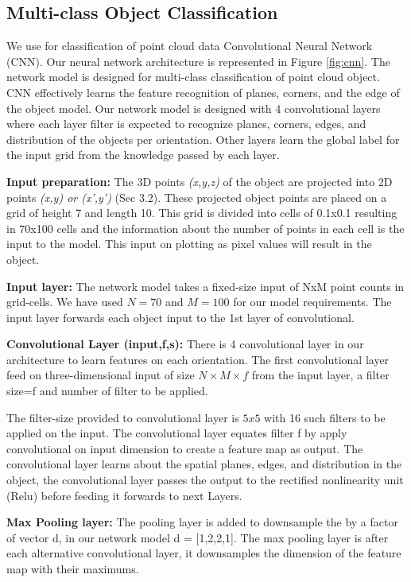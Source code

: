 \subsection{Multi-class Object Classification}
We use for classification of point cloud data Convolutional Neural Network (CNN).
Our neural network architecture is represented in Figure \ref{fig:cnn}.
The network model is designed for multi-class classification of point cloud object.
CNN effectively learns the feature recognition of planes, corners, and the edge of the object model.
Our network model is designed with 4 convolutional layers where each layer filter is expected to
recognize planes, corners, edges, and distribution of the objects per orientation.
Other layers learn the global label for the input grid from the knowledge passed by each layer.

\textbf{Input preparation:}
The 3D points \textit{(x,y,z)} of the object are projected into 2D points \textit{(x,y) or (x',y')} (Sec 3.2).
These projected object points are placed on a grid of height 7 and length 10.
This grid is divided into cells of 0.1x0.1 resulting in 70x100 cells and the information about the number of points in each cell is the input to the model.
This input on plotting as pixel values will result in the object.

\textbf{Input layer:}
The network model takes a fixed-size input of NxM point counts in grid-cells. We have
used $N=70$ and $M=100$ for our model requirements. The input layer forwards each object input to the 1st layer
of convolutional.


\textbf{Convolutional Layer (input,f,s):}
There is 4 convolutional layer in our architecture to learn features on each orientation.
The first convolutional layer feed on three-dimensional input of size $N \times  M \times f$ from
the input layer, a filter size=f and number of filter to be applied.

The filter-size provided to convolutional layer is $5x5$ with 16 such filters to be applied on the input.
The convolutional layer equates filter f by apply convolutional on input dimension to create a feature map as output.
The convolutional layer learns about the spatial planes, edges, and distribution in the object,
the convolutional layer passes the output to the rectified nonlinearity unit (Relu) before feeding
it forwards to next Layers.

\textbf{Max Pooling layer:}
The pooling layer is added to downsample the by a factor of vector d, in
our network model d = [1,2,2,1]. The max pooling layer is after each alternative convolutional
layer, it downsamples the dimension of the feature map with their maximums.

